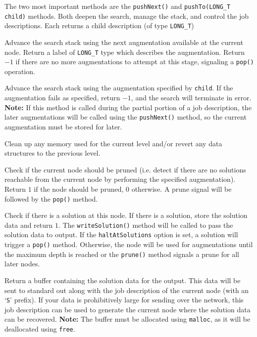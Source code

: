 \documentclass[11pt]{article}
\begin{document}
The two most important methods are the
	\texttt{pushNext()} and \texttt{pushTo(LONG\_T child)} methods.
Both deepen the search, 
	manage the stack, 
	and control the job descriptions.
Each returns a child description (of type \texttt{LONG\_T})
	
	Advance the search stack using the next augmentation available at the current node.
	Return a label of \texttt{LONG\_T} type which describes the augmentation.
	Return $-1$ if there are no more augmentations to attempt at this stage,
		signaling a \texttt{pop()} operation.
	
	Advance the search stack using the augmentation specified by \texttt{child}.
	If the augmentation fails as specified, return $-1$, and the search will terminate in error.
	{\bf Note:} If this method is called during the partial portion of a job description,
		the later augmentations will be called using the \texttt{pushNext()} method,
		so the current augmentation must be stored for later.
	
	Clean up any memory used for the current level
		and/or revert any data structures to the previous level.
		

	Check if the current node should be pruned 
		(i.e. detect if there are no solutions 
			reachable from the current node by performing
			the specified augmentation).
	Return $1$ if the node should be pruned, $0$ otherwise.
	A prune signal will be followed by the \texttt{pop()} method.

	Check if there is a solution at this node.
	If there is a solution, store the solution data and return $1$.
	The \texttt{writeSolution()} method will be called to pass the 
		solution data to output.
	If the \texttt{haltAtSolutions} option is set,
		a solution will trigger a \texttt{pop()} 
		method.
	Otherwise, the node will be used for augmentations 
		until the maximum depth is reached
		or the \texttt{prune()} method 
		signals a prune for all later nodes.
	
	Return a buffer containing the solution data for the output.
	This data will be sent to standard out along with
		the job description of the current node (with an `\texttt{S}' prefix).
	If your data is prohibitively large for sending over the network,
		this job description can be used to generate 
		the current node where the solution data can be recovered.
	{\bf Note:} The buffer must be allocated using \texttt{malloc},
		as it will be deallocated using \texttt{free}.
	
\end{document}
